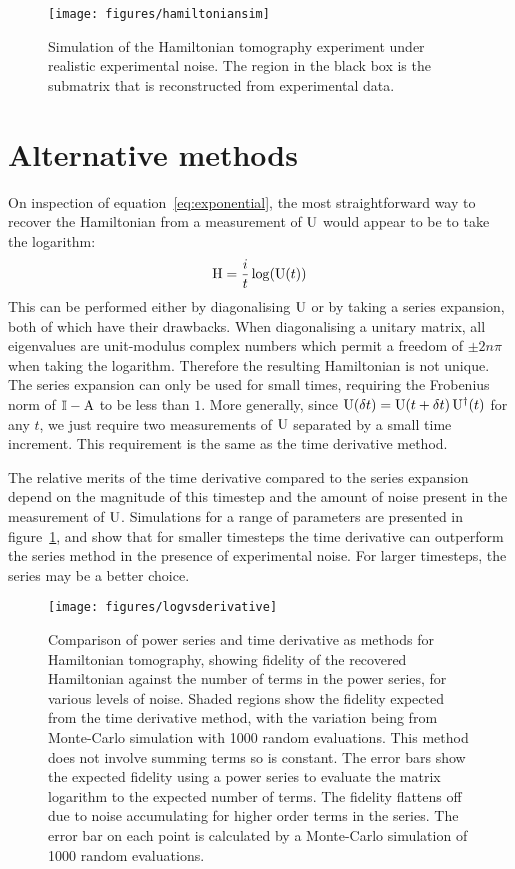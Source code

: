 \begin{figure}
  \centering
  \texttt{[image: figures/hamiltoniansim]}
  \caption[Simulation of the Hamiltonian tomography under experimental noise]
  {Simulation of the Hamiltonian tomography experiment under realistic
  experimental noise. The region in the black box is the submatrix that is
  reconstructed from experimental data.}
\end{figure}

\section{Alternative methods}
\label{sec:Alternatives}
On inspection of equation~\ref{eq:exponential}, the most straightforward way to
recover the Hamiltonian from a measurement of \(\mathrm{U}\) would appear to be to
take the logarithm:
\begin{equation}
  \mathrm{H} = \frac{i}{t} \log \!\left(\mathrm{U} \!\left(t\right)\right)
\end{equation}
This can be performed either by diagonalising \(\mathrm{U}\) or by taking a series
expansion, both of which have their drawbacks. When diagonalising a unitary
matrix, all eigenvalues are unit-modulus complex numbers which permit a freedom
of \(\pm 2 n \pi\) when taking the logarithm. Therefore the resulting
Hamiltonian is not unique. The series expansion can only be used for small
times, requiring the Frobenius norm of \(\mathbb{I}-\mathrm{A}\) to be less than
\(1\). More generally, since \(\mathrm{U} \!\left(\delta t\right) = \mathrm{U} \!\left(t+\delta t\right)
\mathrm{U}^{\dagger} \!\left(t\right)\) for any \(t\), we just require two measurements of
\(\mathrm{U}\) separated by a small time increment. This requirement is the same as
the time derivative method.

The relative merits of the time derivative compared to the series expansion
depend on the magnitude of this timestep and the amount of noise present in the
measurement of \(\mathrm{U}\). Simulations for a range of parameters are presented
in figure~\ref{fig:logvsderivative}, and show that for smaller timesteps the
time derivative can outperform the series method in the presence of experimental
noise. For larger timesteps, the series may be a better choice.

\begin{figure}[h]
  \texttt{[image: figures/logvsderivative]}
  \caption[Comparison of power series and time derivative methods for
  Hamiltonian recovery]
  {Comparison of power series and time derivative as methods for Hamiltonian
  tomography, showing fidelity of the recovered Hamiltonian against the number
  of terms in the power series, for various levels of noise. Shaded regions show
  the fidelity expected from the time derivative method, with the variation
  being from Monte-Carlo simulation with 1000 random evaluations. This method
  does not involve summing terms so is constant. The error bars show the
  expected fidelity using a power series to evaluate the matrix logarithm to the
  expected number of terms. The fidelity flattens off due to noise accumulating
  for higher order terms in the series. The error bar on each point is
  calculated by a Monte-Carlo simulation of 1000 random evaluations.}
  \label{fig:logvsderivative}
\end{figure}

